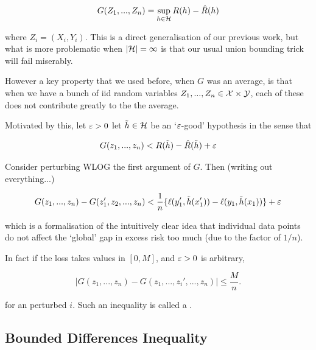 \documentclass[11pt]{scrartcl}
\begin{document}
\begin{equation}
    G(Z_1, ... , Z_n) = \sup_{h \in \mathcal{H}} R(h) - \hat{R}(h)
\label{G definition}
\end{equation}

where $Z_i = (X_i, Y_i)$. This is a direct generalisation of our previous work, but what is more problematic when $|\mathcal{H}| = \infty$ is that our usual union bounding trick will fail miserably. %

However a key property that we used before, when $G$ was an average, is that when we have a bunch of iid random variables $Z_1, ... , Z_n \in \mathcal{X} \times \mathcal{Y}$, each of these does not contribute greatly to the the average. 

Motivated by this, let $\varepsilon > 0$ let $\tilde{h} \in \mathcal{H}$ be an `$\varepsilon$-good' hypothesis in the sense that 

\begin{equation}
    G(z_1, ... , z_n) < R(\tilde{h}) - \hat{R}(\tilde{h}) + \varepsilon
\end{equation}

Consider perturbing WLOG the first argument of $G$. Then (writing out everything...)

\begin{equation}
    G(z_1, ... , z_n) - G(z_1', z_2, ... , z_n) < \frac1n \{ \ell(y_1', \tilde{h}(x_1')) - \ell(y_1, \tilde{h}(x_1)) \} + \varepsilon
\end{equation}

which is a formalisation of the intuitively clear idea that individual data points do not affect the `global' gap in excess risk too much (due to the factor of $1/n$).

In fact if the loss takes values in $[0, M ]$, and $\varepsilon > 0$ is arbitrary, %

\begin{equation}
    | G(z_1, ... , z_n) - G(z_1, ... , z_i', ... , z_n)| \le \frac{M}{n}.
\label{G perturb bounded diff prop}
\end{equation}

for an perturbed $i$. Such an inequality is called a .

\subsection{Bounded Differences Inequality}
\end{document}
